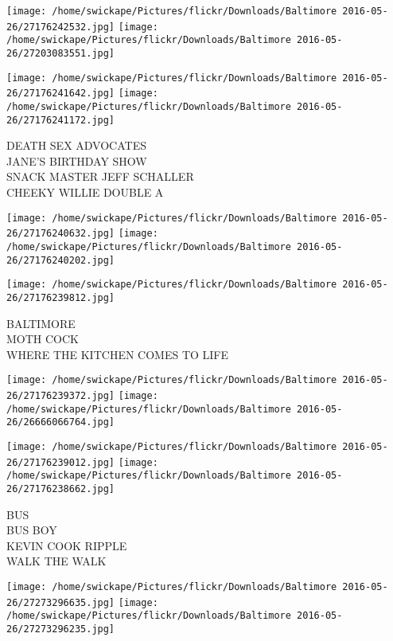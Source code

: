 \documentclass[10pt,letterpaper]{article}
\begin{document}
\texttt{[image: /home/swickape/Pictures/flickr/Downloads/Baltimore 2016-05-26/27176242532.jpg]}
\texttt{[image: /home/swickape/Pictures/flickr/Downloads/Baltimore 2016-05-26/27203083551.jpg]}

\texttt{[image: /home/swickape/Pictures/flickr/Downloads/Baltimore 2016-05-26/27176241642.jpg]}
\texttt{[image: /home/swickape/Pictures/flickr/Downloads/Baltimore 2016-05-26/27176241172.jpg]}

DEATH SEX ADVOCATES\\
JANE'S BIRTHDAY SHOW\\
SNACK MASTER JEFF SCHALLER\\
CHEEKY WILLIE DOUBLE A\\
\pagebreak

\texttt{[image: /home/swickape/Pictures/flickr/Downloads/Baltimore 2016-05-26/27176240632.jpg]}
\texttt{[image: /home/swickape/Pictures/flickr/Downloads/Baltimore 2016-05-26/27176240202.jpg]}

\vspace{0.25in}
\texttt{[image: /home/swickape/Pictures/flickr/Downloads/Baltimore 2016-05-26/27176239812.jpg]}

BALTIMORE\\
MOTH COCK\\
WHERE THE KITCHEN COMES TO LIFE\\
\pagebreak

\texttt{[image: /home/swickape/Pictures/flickr/Downloads/Baltimore 2016-05-26/27176239372.jpg]}
\texttt{[image: /home/swickape/Pictures/flickr/Downloads/Baltimore 2016-05-26/26666066764.jpg]}

\texttt{[image: /home/swickape/Pictures/flickr/Downloads/Baltimore 2016-05-26/27176239012.jpg]}
\texttt{[image: /home/swickape/Pictures/flickr/Downloads/Baltimore 2016-05-26/27176238662.jpg]}

BUS\\
BUS BOY\\
KEVIN COOK RIPPLE\\
WALK THE WALK\\
\pagebreak

\texttt{[image: /home/swickape/Pictures/flickr/Downloads/Baltimore 2016-05-26/27273296635.jpg]}
\texttt{[image: /home/swickape/Pictures/flickr/Downloads/Baltimore 2016-05-26/27273296235.jpg]}
\end{document}
